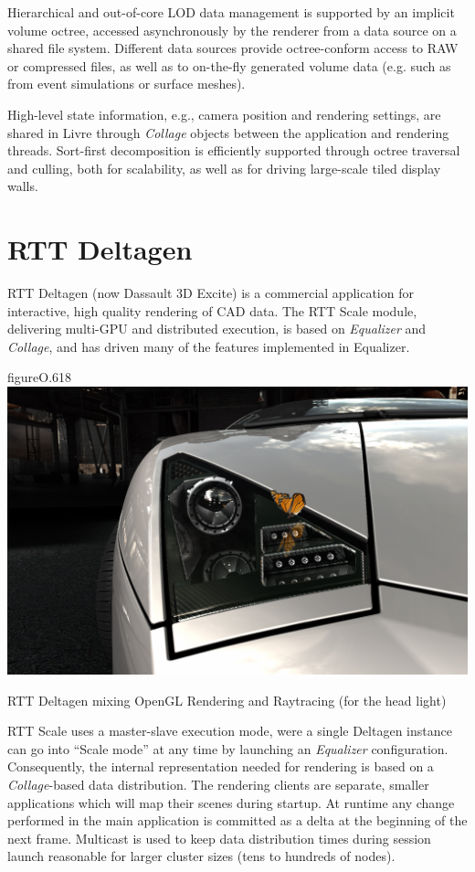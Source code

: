 Hierarchical and out-of-core LOD data management is supported by an implicit
volume octree, accessed asynchronously by the renderer from a data source on a
shared file system. Different data sources provide octree-conform access to
RAW or compressed files, as well as to on-the-fly generated volume data (e.g.
such as from event simulations or surface meshes).

High-level state information, e.g., camera position and rendering settings, are
shared in Livre through {\em Collage} objects between the application and
rendering threads. Sort-first decomposition is efficiently supported through
octree traversal and culling, both for scalability, as well as for driving
large-scale tiled display walls.

\section{RTT Deltagen}

RTT Deltagen (now Dassault 3D Excite) is a commercial application for
interactive, high quality rendering of CAD data. The RTT Scale module,
delivering multi-GPU and distributed execution, is based on {\em Equalizer}
and {\em Collage}, and has driven many of the features implemented in
Equalizer.

\begin{wrapfloat}{figure}{O}{.618\textwidth}
  \includegraphics[width=.618\textwidth]{images/DeltaGen}
  {\caption{\label{fDeltaGen}RTT Deltagen mixing OpenGL Rendering and Raytracing (for the head light)}}
\end{wrapfloat}

RTT Scale uses a master-slave execution mode, were a single Deltagen instance
can go into ``Scale mode'' at any time by launching an {\em Equalizer}
configuration. Consequently, the internal representation needed for rendering
is based on a {\em Collage}-based data distribution. The rendering clients
are separate, smaller applications which will map their scenes during startup.
At runtime any change performed in the main application is committed as a
delta at the beginning of the next frame. Multicast is used to keep data
distribution times during session launch reasonable for larger cluster sizes
(tens to hundreds of nodes).

